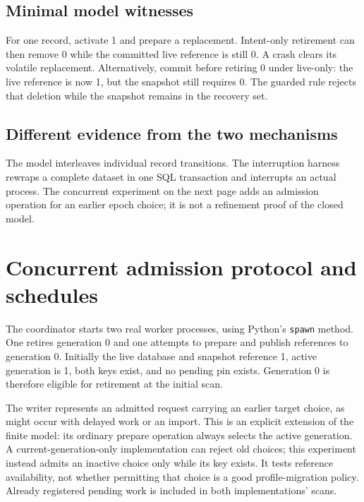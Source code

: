 \documentclass[10pt]{article}
\begin{document}
\subsection*{Minimal model witnesses}
For one record, activate 1 and prepare a replacement. Intent-only retirement can
then remove 0 while the committed live reference is still 0. A crash clears its
volatile replacement. Alternatively, commit before retiring 0 under live-only:
the live reference is now 1, but the snapshot still requires 0. The guarded rule
rejects that deletion while the snapshot remains in the recovery set.

\subsection*{Different evidence from the two mechanisms}
The model interleaves individual record transitions. The interruption harness
rewraps a complete dataset in one SQL transaction and interrupts an actual
process. The concurrent experiment on the next page adds an admission operation
for an earlier epoch choice; it is not a refinement proof of the closed model.

\newpage
\section{Concurrent admission protocol and schedules}
The coordinator starts two real worker processes, using Python's \texttt{spawn}
method. One retires generation 0 and one attempts to prepare and publish references
to generation 0. Initially the live database and snapshot reference 1, active
generation is 1, both keys exist, and no pending pin exists. Generation 0 is
therefore eligible for retirement at the initial scan.

The writer represents an admitted request carrying an earlier target choice,
as might occur with delayed work or an import. This is an explicit extension
of the finite model: its ordinary prepare operation always selects the active
generation. A current-generation-only implementation can reject old choices;
this experiment instead admits an inactive choice only while its key exists.
It tests reference availability, not whether permitting that choice is a good
profile-migration policy. Already registered pending work is included in both
implementations' scans.
\end{document}
